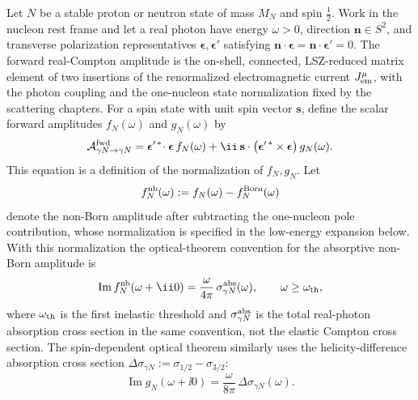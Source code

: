 \begin{definition}
\label{def:qcd-forward-compton-polarizabilities}
Let \(N\) be a stable proton or neutron state of mass \(M_N\) and spin
\(\frac12\).  Work in the nucleon rest frame and let a real photon have energy
\(\omega>0\), direction \(\mathbf n\in S^2\), and transverse polarization
representatives \(\boldsymbol\epsilon,\boldsymbol\epsilon'\) satisfying
\(\mathbf n\cdot\boldsymbol\epsilon
=\mathbf n\cdot\boldsymbol\epsilon'=0\).  The forward real-Compton amplitude
is the on-shell, connected, LSZ-reduced matrix element of two insertions of
the renormalized electromagnetic current \(J_{\rm em}^\mu\), with the photon
coupling and the one-nucleon state normalization fixed by the scattering
chapters.  For a spin state with unit spin vector \(\mathbf s\), define the
scalar forward amplitudes \(f_N(\omega)\) and \(g_N(\omega)\) by
\begin{equation}
  \mathcal A_{\gamma N\to\gamma N}^{\rm fwd}
  =
  \boldsymbol\epsilon'^{\,*}\!\cdot\boldsymbol\epsilon\, f_N(\omega)
  +
  \ii\,\mathbf s\cdot
  \bigl(\boldsymbol\epsilon'^{\,*}\times\boldsymbol\epsilon\bigr)\,
  g_N(\omega).
  \label{eq:qcd-forward-compton-fg-definition}
\end{equation}
This equation is a definition of the normalization of \(f_N,g_N\).  Let
\[
  f_N^{\rm nb}(\omega):=f_N(\omega)-f_N^{\rm Born}(\omega)
\]
denote the non-Born amplitude after subtracting the one-nucleon pole
contribution, whose normalization is specified in the low-energy expansion
below.  With this normalization the optical-theorem convention for the
absorptive non-Born amplitude is
\begin{equation}
  \operatorname{Im}f_N^{\rm nb}(\omega+\ii0)
  =
  \frac{\omega}{4\pi}\,
  \sigma_{\gamma N}^{\rm abs}(\omega),
  \qquad
  \omega\ge\omega_{\rm th},
  \label{eq:qcd-forward-compton-optical-theorem}
\end{equation}
where \(\omega_{\rm th}\) is the first inelastic threshold and
\(\sigma_{\gamma N}^{\rm abs}\) is the total real-photon absorption cross
section in the same convention, not the elastic Compton cross section.  The
spin-dependent optical theorem similarly uses the helicity-difference
absorption cross section
\(\Delta\sigma_{\gamma N}:=\sigma_{1/2}-\sigma_{3/2}\):
\begin{equation}
  \operatorname{Im}g_N(\omega+\ii0)
  =
  \frac{\omega}{8\pi}\,
  \Delta\sigma_{\gamma N}(\omega).
  \label{eq:qcd-forward-spin-compton-optical-theorem}
\end{equation}


\end{definition}
